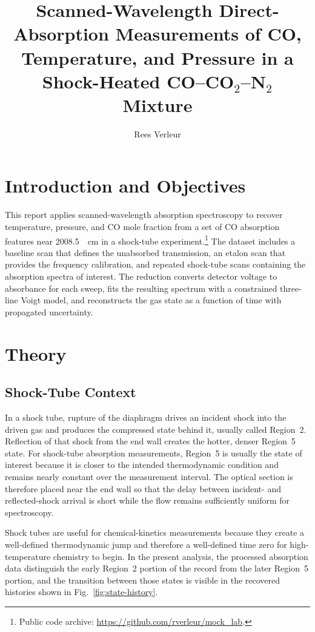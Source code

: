 \documentclass[12pt,letterpaper]{article}
\title{Scanned-Wavelength Direct-Absorption Measurements of CO, Temperature, and Pressure in a Shock-Heated CO--CO$_2$--N$_2$ Mixture}
\author{Rees Verleur}
\date{}
\begin{document}
\maketitle

\section{Introduction and Objectives}

This report applies scanned-wavelength absorption spectroscopy to recover temperature, pressure, and CO mole fraction from a set of CO absorption features near \SI{2008.5}{\per\centi\meter} in a shock-tube experiment.\footnote{Public code archive: \url{https://github.com/rverleur/mock_lab}.} The dataset includes a baseline scan that defines the unabsorbed transmission, an etalon scan that provides the frequency calibration, and repeated shock-tube scans containing the absorption spectra of interest. The reduction converts detector voltage to absorbance for each sweep, fits the resulting spectrum with a constrained three-line Voigt model, and reconstructs the gas state as a function of time with propagated uncertainty.

\section{Theory}

\subsection*{Shock-Tube Context}

In a shock tube, rupture of the diaphragm drives an incident shock into the driven gas and produces the compressed state behind it, usually called Region~2. Reflection of that shock from the end wall creates the hotter, denser Region~5 state. For shock-tube absorption measurements, Region~5 is usually the state of interest because it is closer to the intended thermodynamic condition and remains nearly constant over the measurement interval. The optical section is therefore placed near the end wall so that the delay between incident- and reflected-shock arrival is short while the flow remains sufficiently uniform for spectroscopy.

Shock tubes are useful for chemical-kinetics measurements because they create a well-defined thermodynamic jump and therefore a well-defined time zero for high-temperature chemistry to begin. In the present analysis, the processed absorption data distinguish the early Region~2 portion of the record from the later Region~5 portion, and the transition between those states is visible in the recovered histories shown in Fig.~\ref{fig:state-history}.
\end{document}
